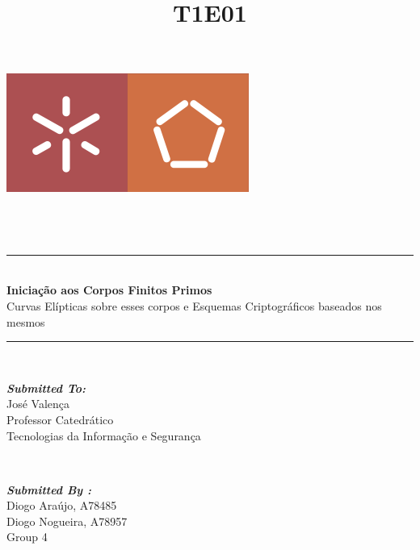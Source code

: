 \documentclass[12pt]{report}
\title{T1E01}
\begin{document}
    
\begin{titlepage}
	\centering
    \vspace*{0.5 cm}
    \includegraphics[scale = 0.50]{logo.png}\\[1.0 cm]	%
	\\[0.1 cm]
	\\[3.0 cm]
	\\[0.5 cm]				%
	\rule{\linewidth}{0.2 mm} \\[0.4 cm]
	{ \huge \bfseries Iniciação aos Corpos Finitos Primos}\\[0.3 cm]
	{ \LARGE Curvas Elípticas sobre esses corpos e Esquemas Criptográficos baseados nos mesmos}
	\rule{\linewidth}{0.2 mm} \\[3.5 cm]
	
	\begin{minipage}{0.4\textwidth}
		\begin{flushleft} \large
			\emph{\textbf{Submitted To:}}\\
			José Valença\\
            Professor Catedrático\\
             Tecnologias da Informação e Segurança\\
			\end{flushleft}
			\end{minipage}~
			\begin{minipage}{0.4\textwidth}
            
			\begin{flushright} \large
			\emph{\textbf{Submitted By :}} \\
			Diogo Araújo, A78485\\
		Diogo Nogueira, A78957\\
            Group 4\\
		\end{flushright}
        
	\end{minipage}\\[2 cm]

	
\end{titlepage}
    
\end{document}
